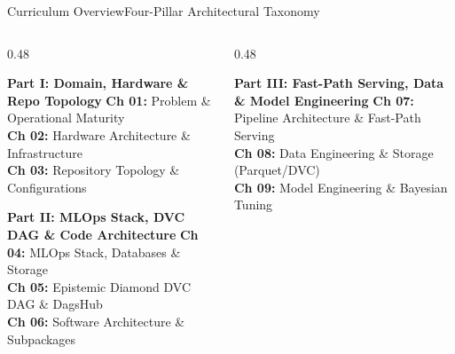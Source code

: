 \documentclass[aspectratio=169]{beamer}
\begin{document}
\begin{frame}{Curriculum Overview}{Four-Pillar Architectural Taxonomy}
    \begin{columns}[T]
        \begin{column}{0.48\textwidth}
            \begin{block}{\textbf{Part I: Domain, Hardware \& Repo Topology}}
                \scriptsize
                \textbf{Ch 01:} Problem \& Operational Maturity \\
                \textbf{Ch 02:} Hardware Architecture \& Infrastructure \\
                \textbf{Ch 03:} Repository Topology \& Configurations
            \end{block}
            \vspace{0.15cm}
            \begin{block}{\textbf{Part II: MLOps Stack, DVC DAG \& Code Architecture}}
                \scriptsize
                \textbf{Ch 04:} MLOps Stack, Databases \& Storage \\
                \textbf{Ch 05:} Epistemic Diamond DVC DAG \& DagsHub \\
                \textbf{Ch 06:} Software Architecture \& Subpackages
            \end{block}
        \end{column}
        \begin{column}{0.48\textwidth}
            \begin{block}{\textbf{Part III: Fast-Path Serving, Data \& Model Engineering}}
                \scriptsize
                \textbf{Ch 07:} Pipeline Architecture \& Fast-Path Serving \\
                \textbf{Ch 08:} Data Engineering \& Storage (Parquet/DVC) \\
                \textbf{Ch 09:} Model Engineering \& Bayesian Tuning
            \end{block}
            \vspace{0.15cm}

\end{column}
\end{columns}
\end{frame}
\end{document}
